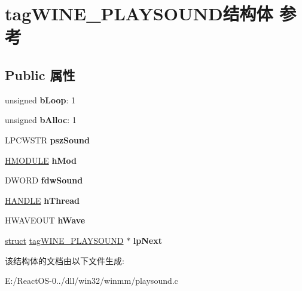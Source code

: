 \hypertarget{structtag_w_i_n_e___p_l_a_y_s_o_u_n_d}{}\section{tag\+W\+I\+N\+E\+\_\+\+P\+L\+A\+Y\+S\+O\+U\+N\+D结构体 参考}
\label{structtag_w_i_n_e___p_l_a_y_s_o_u_n_d}
\subsection*{Public 属性}
\begin{DoxyCompactItemize}
\item 
\mbox{\label{structtag_w_i_n_e___p_l_a_y_s_o_u_n_d_a5d540409699293dfe7e25bcb60a8bf52}} 
unsigned {\bfseries b\+Loop}\+: 1
\item 
\mbox{\label{structtag_w_i_n_e___p_l_a_y_s_o_u_n_d_a421b654fc4078f559994d9980c7f8349}} 
unsigned {\bfseries b\+Alloc}\+: 1
\item 
\mbox{\label{structtag_w_i_n_e___p_l_a_y_s_o_u_n_d_afbb92c3bce7d861e7322aa6065b642c0}} 
L\+P\+C\+W\+S\+TR {\bfseries psz\+Sound}
\item 
\mbox{\label{structtag_w_i_n_e___p_l_a_y_s_o_u_n_d_a318d917f82f419dc00f59cd6d22274cd}} 
\hyperlink{interfacevoid}{H\+M\+O\+D\+U\+LE} {\bfseries h\+Mod}
\item 
\mbox{\label{structtag_w_i_n_e___p_l_a_y_s_o_u_n_d_a8f873c245a82c61eb5d04083eb3bdbe5}} 
D\+W\+O\+RD {\bfseries fdw\+Sound}
\item 
\mbox{\label{structtag_w_i_n_e___p_l_a_y_s_o_u_n_d_a2ebe773bc68927b0562fb9e5debfb7ca}} 
\hyperlink{interfacevoid}{H\+A\+N\+D\+LE} {\bfseries h\+Thread}
\item 
\mbox{\label{structtag_w_i_n_e___p_l_a_y_s_o_u_n_d_acd8862ae90d1fbbe08a6d1e3f48583b0}} 
H\+W\+A\+V\+E\+O\+UT {\bfseries h\+Wave}
\item 
\mbox{\label{structtag_w_i_n_e___p_l_a_y_s_o_u_n_d_a0ec8fa08becb57172227bf0d4e5291fb}} 
\hyperlink{interfacestruct}{struct} \hyperlink{structtag_w_i_n_e___p_l_a_y_s_o_u_n_d}{tag\+W\+I\+N\+E\+\_\+\+P\+L\+A\+Y\+S\+O\+U\+ND} $\ast$ {\bfseries lp\+Next}
\end{DoxyCompactItemize}


该结构体的文档由以下文件生成\+:\begin{DoxyCompactItemize}
\item 
E\+:/\+React\+O\+S-\/0../dll/win32/winmm/playsound.\+c\end{DoxyCompactItemize}
